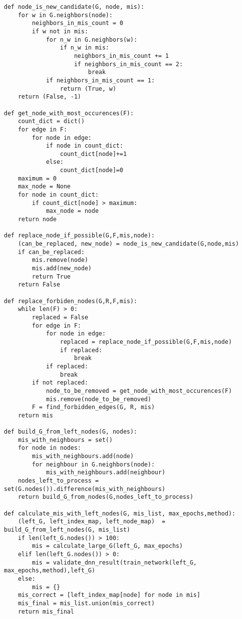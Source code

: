 \begin{lstlisting}
def node_is_new_candidate(G, node, mis):
    for w in G.neighbors(node):
        neighbors_in_mis_count = 0
        if w not in mis:
            for n_w in G.neighbors(w):
                if n_w in mis:
                    neighbors_in_mis_count += 1
                    if neighbors_in_mis_count == 2:
                        break
            if neighbors_in_mis_count == 1:
                return (True, w)
    return (False, -1) 

def get_node_with_most_occurences(F):
    count_dict = dict()
    for edge in F:
        for node in edge:
            if node in count_dict:
                count_dict[node]+=1
            else:
                count_dict[node]=0
    maximum = 0
    max_node = None
    for node in count_dict:
        if count_dict[node] > maximum:
            max_node = node
    return node

def replace_node_if_possible(G,F,mis,node):
    (can_be_replaced, new_node) = node_is_new_candidate(G,node,mis)
    if can_be_replaced:
        mis.remove(node)
        mis.add(new_node)
        return True
    return False 

def replace_forbiden_nodes(G,R,F,mis):
    while len(F) > 0:
        replaced = False
        for edge in F:
            for node in edge:
                replaced = replace_node_if_possible(G,F,mis,node)
                if replaced:
                    break
            if replaced:
                break
        if not replaced:
            node_to_be_removed = get_node_with_most_occurences(F)
            mis.remove(node_to_be_removed)
        F = find_forbidden_edges(G, R, mis)
    return mis

def build_G_from_left_nodes(G, nodes):
    mis_with_neighbours = set()
    for node in nodes:
        mis_with_neighbours.add(node)
        for neighbour in G.neighbors(node):
            mis_with_neighbours.add(neighbour)
    nodes_left_to_process = set(G.nodes()).difference(mis_with_neighbours)
    return build_G_from_nodes(G,nodes_left_to_process)

def calculate_mis_with_left_nodes(G, mis_list, max_epochs,method):
    (left_G, left_index_map, left_node_map)  = build_G_from_left_nodes(G, mis_list)
    if len(left_G.nodes()) > 100:
        mis = calculate_large_G(left_G, max_epochs)
    elif len(left_G.nodes()) > 0:
        mis = validate_dnn_result(train_network(left_G, max_epochs,method),left_G)
    else:
        mis = {}
    mis_correct = [left_index_map[node] for node in mis]
    mis_final = mis_list.union(mis_correct)
    return mis_final


\end{lstlisting}
